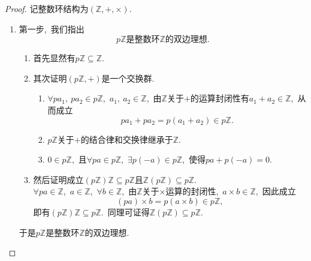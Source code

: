 \documentclass[UTF8, twoside]{ctexart}
\theoremstyle{nonumberplain}
\newtheorem{proof}{\heiti 证明}  %
\theoremstyle{nonumberplain}
\theoremstyle{plain}
\begin{document}
	\begin{proof}
		记整数环结构为$\left( \mathbb{Z},+,\times  \right)$.
		\vskip 0.3cm
		\begin{enumerate}
			\item 第一步,\ 我们指出
			\[p\mathbb{Z}\text{是整数环}\mathbb{Z}\text{的双边理想}.\]
			\vskip 0.3cm
			\begin{enumerate}
				\item 首先显然有$p\mathbb{Z}\subseteq \mathbb{Z}$.
				\vskip 0.3cm
				
				\item 其次证明$\left( p\mathbb{Z},+ \right)$是一个交换群.\ 
				\vskip 0.3cm
				\begin{enumerate}
					\item $\forall p{{a}_{1}},\ p{{a}_{2}}\in p\mathbb{Z}$,\ ${{a}_{1}},\ {{a}_{2}}\in \mathbb{Z}$,\ 由$\mathbb{Z}$关于$+$的运算封闭性有${{a}_{1}}+{{a}_{2}}\in \mathbb{Z}$,\ 从而成立
					\[
					p{{a}_{1}}+p{{a}_{2}}=p\left( {{a}_{1}}+{{a}_{2}} \right)\in p\mathbb{Z}.
					\]
					\vskip 0.3cm
					
					\item $p\mathbb{Z}$关于$+$的结合律和交换律继承于$\mathbb{Z}$.
					\vskip 0.3cm
					
					\item $0\in p\mathbb{Z}$,\ 且$\forall pa\in p\mathbb{Z}$,\ 
					$\exists p\left( -a \right)\in p\mathbb{Z}$,\ 使得$pa+p\left( -a \right)=0$. 
				\end{enumerate}
				\vskip 0.3cm
				
				\item 然后证明成立$\left( p\mathbb{Z} \right)\mathbb{Z}\subseteq p\mathbb{Z}$且$\mathbb{Z}\left( p\mathbb{Z} \right)\subseteq p\mathbb{Z}$. \\
				$\forall pa\in \mathbb{Z}$,\ $a\in \mathbb{Z}$,\ $\forall b\in \mathbb{Z}$,\ 由$\mathbb{Z}$关于$\times $运算的封闭性,\ $a\times b\in \mathbb{Z}$,\ 因此成立
				\[
				\left( pa \right)\times b=p\left( a\times b \right)\in p\mathbb{Z},
				\]
				即有$\left( p\mathbb{Z} \right)\mathbb{Z}\subseteq p\mathbb{Z}$.\ 同理可证得$\mathbb{Z}\left( p\mathbb{Z} \right)\subseteq p\mathbb{Z}$. 
			\end{enumerate}
			\vskip 0.3cm
			于是$p\mathbb{Z}$是整数环$\mathbb{Z}$的双边理想.\ 
			\vskip 0.3cm
			

\end{enumerate}
\end{proof}
\end{document}

